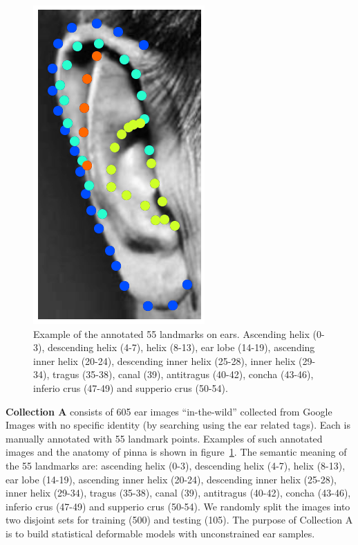 \begin{figure}
    \includegraphics[height=\flowhhh]{resources/Ear_Deformable_Model/dbs/db_12}
    \caption{Example of the annotated 55 landmarks on ears. Ascending helix (0-3), descending helix (4-7), helix (8-13), ear lobe (14-19), ascending inner helix (20-24), descending inner helix (25-28), inner helix (29-34), tragus (35-38), canal (39), antitragus (40-42), concha (43-46), inferio crus (47-49) and supperio crus (50-54).}
    \label{fig:db_example}
\end{figure}

\textbf{Collection A} consists of 605 ear images ``in-the-wild'' collected from Google Images with no specific identity (by searching using the ear related tags). Each is manually annotated with 55 landmark points. Examples of such annotated images and the anatomy of pinna is shown in figure~\ref{fig:db_example}. The semantic meaning of the 55 landmarks are: ascending helix (0-3), descending helix (4-7), helix (8-13), ear lobe (14-19), ascending inner helix (20-24), descending inner helix (25-28), inner helix (29-34), tragus (35-38), canal (39), antitragus (40-42), concha (43-46), inferio crus (47-49) and supperio crus (50-54). We randomly split the images into two disjoint sets for training (500) and testing (105). The purpose of Collection A is to build statistical deformable models with unconstrained ear samples.

